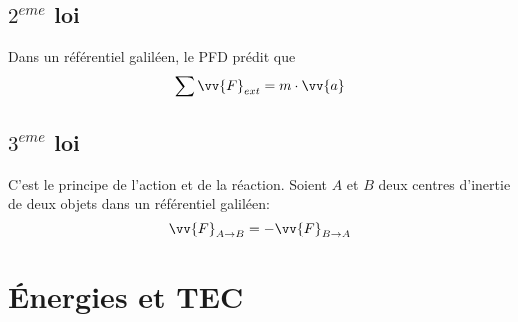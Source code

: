 \subsection{$2^{eme}$ loi}

\begin{Definition}
Dans un référentiel galiléen, le PFD prédit que
$$\sum \vv{F}_{ext} = m\cdot \vv{a} $$
\end{Definition}

\subsection{$3^{eme}$ loi}

\begin{Definition}
C'est le principe de l'action et de la réaction. Soient $A$ et $B$ deux centres d'inertie de deux objets dans un référentiel galiléen:
$$\vv{F}_{A\rightarrow B} = - \vv{F}_{B\rightarrow A}$$

\end{Definition}


\section{Énergies et TEC}

